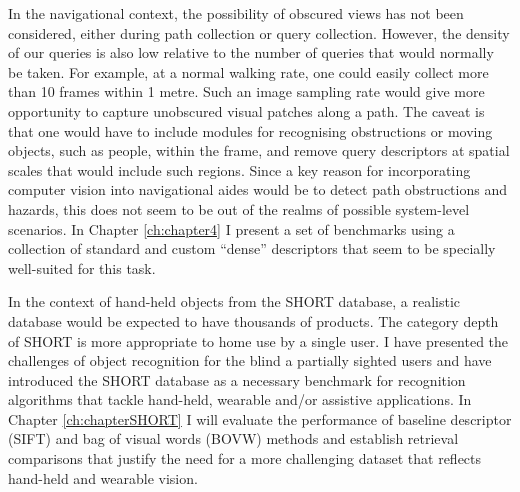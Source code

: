 In the navigational context, the possibility of obscured views has not been considered, either during path collection or query collection. However, the density of our queries is also low relative to the number of queries that would normally be taken. For example, at a normal walking rate, one could easily collect more than 10 frames within 1 metre. Such an image sampling rate would give more opportunity to capture unobscured visual patches along a path. The caveat is that one would have to include modules for recognising obstructions or moving objects, such as people, within the frame, and remove query descriptors at  spatial scales that would include such regions. Since a key reason for incorporating computer vision into navigational aides would be to detect path obstructions and hazards, this does not seem to be out of the realms of possible system-level scenarios. In Chapter \ref{ch:chapter4} I present a set of benchmarks using a collection of standard and custom ``dense'' descriptors that seem to be specially well-suited for this task.

In the context of hand-held objects from the SHORT database, a realistic database would be expected to have thousands of products. The category depth of SHORT is more appropriate to home use by a single user. I have presented the challenges of object recognition for the blind a partially sighted users and have introduced the SHORT database as a necessary benchmark for recognition algorithms that tackle hand-held, wearable and/or assistive applications. In Chapter \ref{ch:chapterSHORT} I will evaluate the performance of baseline descriptor (SIFT) and bag of visual words (BOVW) methods and establish retrieval comparisons that justify the need for a more challenging dataset that reflects hand-held and wearable vision.




